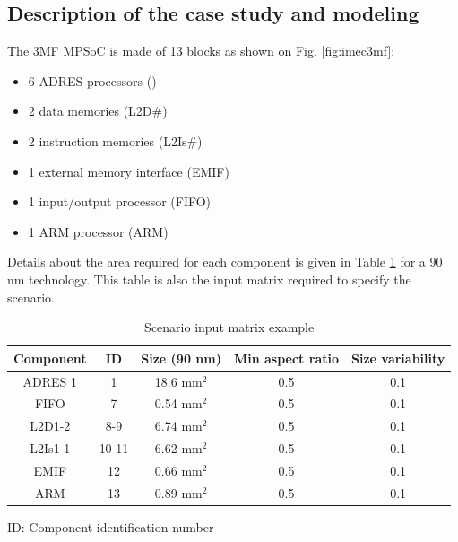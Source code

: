\subsection{Description of the case study and modeling}
The 3MF MPSoC is made of 13 blocks as shown on Fig. \ref{fig:imec3mf}:
\begin{itemize}
\item 6 ADRES processors (\cite{conf/fpl/VeredasSMM05})
\item 2 data memories (L2D\#)
\item 2 instruction memories (L2Is\#)
\item 1 external memory interface (EMIF)
\item 1 input/output processor (FIFO)
\item 1 ARM processor (ARM)
\end{itemize}
Details about the area required for each component is given in Table \ref{tab:scenarmat} for a 90 nm technology. This table is also the input matrix required to specify the scenario.

\begin{table}[pt!]
\caption{Scenario input matrix example}
\begin{center}
\begin{scriptsize}
\begin{tabular}{|c|c|c|c|c|}
\hline Component & ID & Size (90 nm) & Min aspect ratio & Size variability\\
\hline ADRES 1\texttildelow 6 & 1\texttildelow 6 & 18.6 mm$^2$ & 0.5 & 0.1\\
FIFO & 7 & 0.54 mm$^2$ & 0.5 & 0.1\\
L2D1-2 & 8-9 & 6.74 mm$^2$ & 0.5 & 0.1\\
L2Is1-1 & 10-11 & 6.62 mm$^2$ & 0.5 & 0.1\\
EMIF & 12 & 0.66 mm$^2$ & 0.5 & 0.1\\
ARM & 13 & 0.89 mm$^2$ & 0.5 & 0.1\\
\hline
\end{tabular}
\end{scriptsize}
\end{center}
\begin{center}
ID: Component identification number
\end{center}
\label{tab:scenarmat}
\end{table}

